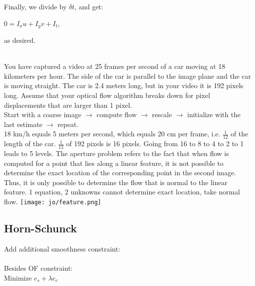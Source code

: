 Finally, we divide by $\delta t$, and get:

$0 = I_xu + I_yv + I_t$,

as desired.
\BoxEnd

\BoxStart
{}\\
You have captured a video at 25 frames per second of a car moving at 18 kilometers
per hour. The side of the car is parallel to the image plane and the car is moving
straight. The car is 2.4 meters long, but in your video it is 192 pixels long. Assume
that your optical flow algorithm breaks down for pixel displacements that are larger
than 1 pixel.\\
Start with a coarse image $\rightarrow$ compute flow $\rightarrow$ rescale $\rightarrow$ initialize with the last estimate $\rightarrow$ repeat.\\
18 km/h equals 5 meters per second, which equals 20 cm per frame, i.e. $\frac{1}{12}$ of the
length of the car. $\frac{1}{12}$ of 192 pixels is 16 pixels. Going from 16 to 8 to 4 to 2 to 1
leads to 5 levels.
\BoxEnd
{} The aperture problem refers to the fact that when flow is computed for a point that lies along a linear feature, it is not possible to determine the exact location of the corresponding point in the second image. Thus, it is only possible to determine the flow that is normal to the linear feature. 1 equation, 2 unknowns cannot determine exact location, take normal flow. \texttt{[image: jo/feature.png]}\\
\subsection*{Horn-Schunck}
Add additional smoothness constraint: \\
\\
Besides OF constraint: \\
 Minimize $e_s + \lambda e_c$
